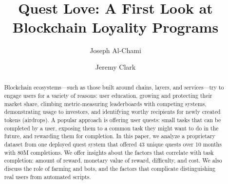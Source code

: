 \documentclass[runningheads]{llncs}
\begin{document}
\title{Quest Love: A First Look at Blockchain Loyality Programs}

\author{
	Joseph Al-Chami \and 
	Jeremy Clark
	}

	
	

\maketitle



\begin{abstract}

Blockchain ecosystems---such as those built around chains, layers, and services---try to engage users for a variety of reasons: user education, growing and protecting their market share, climbing metric-measuring leaderboards with competing systems, demonstrating usage to investors, and identifying worthy recipients for newly created tokens (airdrops). A popular approach is offering user quests: small tasks that can be completed by a user, exposing them to a common task they might want to do in the future, and rewarding them for completion. In this paper, we analyze a proprietary dataset from one deployed quest system that offered 43 unique quests over 10 months with 80M completions. We offer insights about the factors that correlate with task completion: amount of reward, monetary value of reward, difficulty, and cost. We also discuss the role of farming and bots, and the factors that complicate distinguishing real users from automated scripts.

\end{abstract}




\end{document}
